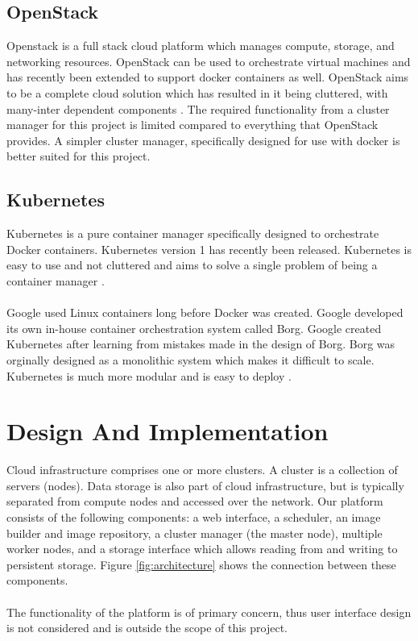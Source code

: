 \documentclass{sig-alternate-05-2015}
\begin{document}
\subsection{OpenStack}
Openstack is a full stack cloud platform which manages compute, storage, and networking resources. OpenStack can be used to orchestrate virtual machines and has recently been extended to support docker containers as well. OpenStack aims to be a complete cloud solution which has resulted in it being cluttered, with many-inter dependent components \cite{affetti2015adock}. The required functionality  from a cluster manager for this project is limited compared to everything that OpenStack provides. A simpler cluster manager, specifically designed for use with docker is better suited for this project.


\subsection{Kubernetes}
Kubernetes is a pure container manager specifically designed to orchestrate Docker containers. Kubernetes version 1 has recently been released. Kubernetes is easy to use and not cluttered and aims to solve a single problem of being a container manager \cite{googleborg}. 
\\\\
Google used Linux containers long before Docker was created. Google developed its own in-house container orchestration system called Borg. Google created Kubernetes after learning from mistakes made in the design of Borg. Borg was orginally designed as a monolithic system which makes it difficult to scale. Kubernetes is much more modular and is easy to deploy \cite{googleborg}.


\section{Design And Implementation}


Cloud infrastructure comprises one or more clusters. A cluster is a collection of servers (nodes). Data storage is also part of cloud infrastructure, but is typically separated from compute nodes and accessed over the network. Our platform consists of the following components: a web interface, a scheduler, an image builder and image repository, a cluster manager (the master node), multiple worker nodes, and a storage interface which allows reading from and writing to persistent storage. Figure \ref{fig:architecture} shows the connection between these components.
\\\\
The functionality of the platform is of primary concern, thus user interface design is not considered and is outside the scope of this project. 
\end{document}
